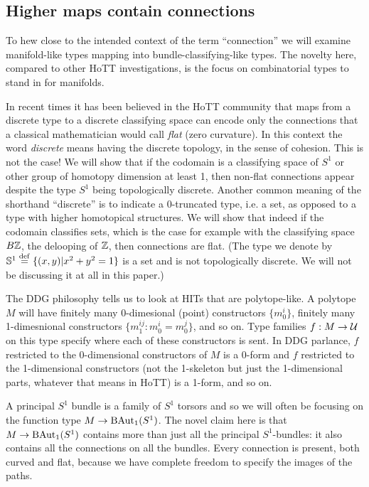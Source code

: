 \documentclass[12pt]{article}
\begin{document}
\subsection{Higher maps contain connections}

To hew close to the intended context of the term ``connection'' we will examine manifold-like types mapping into bundle-classifying-like types. The novelty here, compared to other HoTT investigations, is the focus on combinatorial types to stand in for manifolds.

In recent times it has been believed in the HoTT community that maps from a discrete type to a discrete classifying space can encode only the connections that a classical mathematician would call \emph{flat} (zero curvature). In this context the word \emph{discrete} means having the discrete topology, in the sense of cohesion\cite{shulman_cohesion}. This is not the case! We will show that if the codomain is a classifying space of \( S^1 \) or other group of homotopy dimension at least 1, then non-flat connections appear despite the type \( S^1 \) being topologically discrete. Another common meaning of the shorthand ``discrete'' is to indicate a 0-truncated type, i.e. a set, as opposed to a type with higher homotopical structures. We will show that indeed if the codomain classifies sets, which is the case for example with the classifying space \( B\mathbb{Z} \), the delooping of \( \mathbb{Z} \), then connections are flat. (The type we denote by \( \mathbb{S}^1\stackrel{\mathrm{def}}{=}\{(x, y)|x^2+y^2=1\} \) is a set and is not topologically discrete. We will not be discussing it at all in this paper.)

The DDG philosophy tells us to look at HITs that are polytope-like. A polytope \( M \) will have finitely many 0-dimesional (point) constructors \( \{m_0^i\} \), finitely many 1-dimesnional constructors \( \{m_1^{ij}:m_0^i=m_0^j\} \), and so on. Type families \( f:M\to \mathcal{U} \) on this type specify where each of these constructors is sent. In DDG parlance, \( f \) restricted to the 0-dimensional constructors of \( M \) is a 0-form and \( f \) restricted to the 1-dimensional constructors (not the 1-skeleton but just the 1-dimensional parts, whatever that means in HoTT) is a 1-form, and so on.

A principal \( S^1 \) bundle is a family of \( S^1 \) torsors and so we will often be focusing on the function type \( M\to \mathrm{BAut}_1(S^1) \). The novel claim here is that \( M\to \mathrm{BAut}_1(S^1) \) contains more than just all the principal \( S^1 \)-bundles: it also contains all the connections on all the bundles. Every connection is present, both curved and flat, because we have complete freedom to specify the images of the paths.
\end{document}
